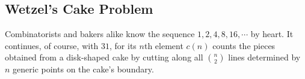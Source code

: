 \documentclass[twocolumn, 11pt]{article}
\theoremstyle{definition}
\newcommand{\msec}[1]{\subsection*{\color{mblu}\textsf{#1}}}
\begin{document}

    \msec{Wetzel's Cake Problem}

        Combinatorists and bakers alike know the sequence $1, 2, 4, 8, 16,
        \cdots$ by heart.  It continues, of course, with $31$, for its $n$th
        element $c(n)$ counts the pieces obtained from a disk-shaped cake by
        cutting along all ${n\choose 2}$ lines determined by $n$ generic points
        on the cake's boundary.
\end{document}
